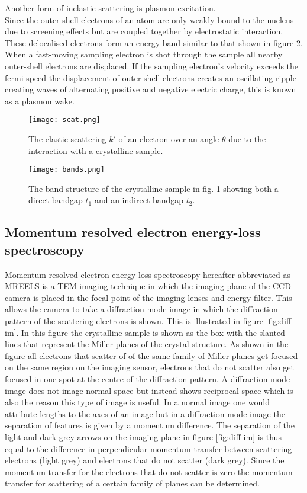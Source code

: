 Another form of inelastic scattering is plasmon excitation.\\
Since the outer-shell electrons of an atom are only weakly bound to the nucleus due to screening effects but are coupled together by electrostatic interaction. These delocalised electrons form an energy band similar to that shown in figure \ref{fig:bands}.
When a fast-moving sampling electron is shot through the sample all nearby outer-shell electrons are displaced. If the sampling electron's velocity exceeds the fermi speed the displacement of outer-shell electrons creates an oscillating ripple creating waves of alternating positive and negative electric charge, this is known as a plasmon wake.



\begin{figure}
	\centering
	\texttt{[image: scat.png]}
	\caption{The elastic scattering $k'$ of an electron over an angle $\theta$ due to the interaction with a crystalline sample.}
	\label{fig:scat}
\end{figure}

\begin{figure}
	\centering
	\texttt{[image: bands.png]}
	\caption{The band structure of the crystalline sample in fig. \ref{fig:scat} showing both a direct bandgap $t_1$ and an indirect bandgap $t_2$.}
	\label{fig:bands}
\end{figure}


\subsection{Momentum resolved electron energy-loss spectroscopy}
\label{sec:MREELS}
Momentum resolved electron energy-loss spectroscopy hereafter abbreviated as MREELS is a TEM imaging technique in which the imaging plane of the CCD camera is placed in the focal point of the imaging lenses and energy filter.
This allows the camera to take a diffraction mode image in which the diffraction pattern of the scattering electrons is shown. This is illustrated in figure \ref{fig:diff-im}. In this figure the crystalline sample is shown as the box with the slanted lines that represent the Miller planes of the crystal structure.
As shown in the figure all electrons that scatter of of the same family of Miller planes get focused on the same region on the imaging sensor, electrons that do not scatter also get focused in one spot at the centre of the diffraction pattern.
A diffraction mode image does not image normal space but instead shows reciprocal space which is also the reason this type of image is useful. In a normal image one would attribute lengths to the axes of an image but in a diffraction mode image the separation of features is given by a momentum difference.
The separation of the light and dark grey arrows on the imaging plane in figure \ref{fig:diff-im} is thus equal to the difference in perpendicular momentum transfer between scattering electrons (light grey) and electrons that do not scatter (dark grey).
Since the momentum transfer for the electrons that do not scatter is zero the momentum transfer for scattering of a certain family of planes can be determined.


